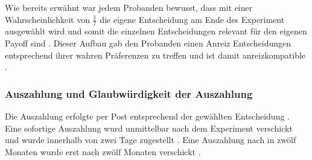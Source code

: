 \documentclass[11pt,a4paper]{article}
\begin{document}
\begin{table}[!htbp] 
\centering 
  \caption{Auszahlungsmatrix der intertemporalen Entscheidung}
\begin{center}
\end{center}
\end{table}

Wie bereits erwähnt war jedem Probanden bewusst, dass mit einer Wahrscheinlichkeit von $\frac{1}{7}$ die eigene Entscheidung am Ende des Experiment ausgewählt wird und somit die einzelnen Entscheidungen relevant für den eigenen Payoff sind \parencite{dohmen2010risk}. Dieser Aufbau gab den Probanden einen Anreiz Entscheidungen entsprechend ihrer wahren Präferenzen zu treffen und ist damit anreizkompatible \parencite{dohmen2012interpreting}.

\subsubsection{Auszahlung und Glaubwürdigkeit der Auszahlung}
Die Auszahlung erfolgte per Post entsprechend der gewählten Entscheidung \parencite{dohmen2012interpreting}. Eine sofortige Auszahlung wurd unmittelbar nach dem Experiment verschickt und wurde innerhalb von zwei Tage zugestellt \parencite{dohmen2012interpreting}. Eine Auszahlung nach in zwölf Monaten wurde erst nach zwölf Monaten verschickt \parencite{dohmen2012interpreting}.\\
\end{document}
